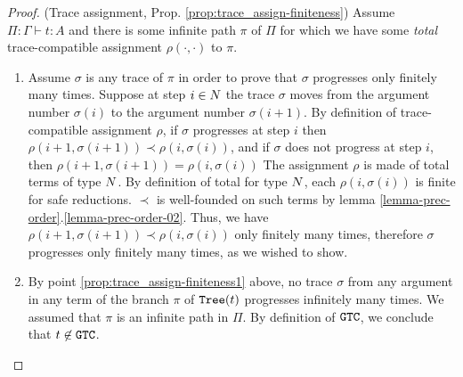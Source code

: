 \begin{proof}(Trace assignment, Prop.
\ref{prop:trace_assign-finiteness})
Assume $\Pi:\Gamma \vdash t:A$ and there is some infinite path $\pi$ of $\Pi$ for which we 
have some \emph{total} trace-compatible assignment  $\rho(\cdot,\cdot)$ to $\pi$.
\begin{enumerate}
\item
Assume $\sigma$ is any trace of $\pi$ in order to prove
that $\sigma$ progresses only finitely many times.
Suppose at step $i \in {N}$ the trace $\sigma$ moves from the argument number 
$\sigma(i)$ to the argument number $\sigma(i+1)$.
By definition of trace-compatible assignment $\rho$, if $\sigma$ progresses at step $i$
then $\rho(i+1,\sigma(i+1))\prec \rho(i,\sigma(i))$, and if $\sigma$ 
does not progress at step $i$,  then  $\rho(i+1,\sigma(i+1)) = \rho(i,\sigma(i))$
The assignment $\rho$ is made of total terms of type ${N}$.
By definition of total for type ${N}$, each $\rho(i,\sigma(i))$ is finite for safe reductions. 
$\prec$ is well-founded on such terms
by lemma \ref{lemma-prec-order}.\ref{lemma-prec-order-02}.
Thus, we have $\rho(i+1,\sigma(i+1))\prec \rho(i,\sigma(i))$ only finitely many times, 
therefore $\sigma$ progresses only finitely many times, as we wished to show.

\item
By point \ref{prop:trace_assign-finiteness1} above, no trace $\sigma$ 
from any argument in any term of the branch $\pi$ of ${\tt Tree}(t)$ progresses infinitely many 
times. We assumed that $\pi$ is an infinite path in $\Pi$.
By definition of ${\tt GTC}$, we conclude that $t \not \in {\tt GTC}$. 
\end{enumerate}
\end{proof}


%
%
%
%
%
%
%

